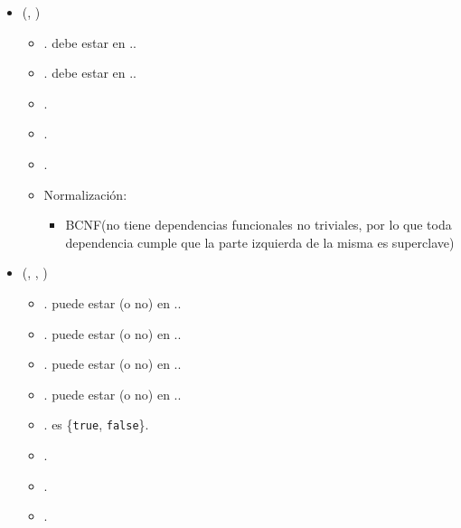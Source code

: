\begin{itemize}
        \item {}(, )
            \begin{itemize}
                \item {}. debe estar en 
                    ..
                \item {}. debe estar en 
                    ..
                \item {}.
                \item {}.
                \item {}.
                \item Normalización:
                    \begin{itemize}
                        \item BCNF(no tiene dependencias funcionales no 
                            triviales, por lo que toda dependencia cumple que la
                            parte izquierda de la misma es superclave)
                    \end{itemize}

            \end{itemize}

        \item {}(, , 
            )
            \begin{itemize}
                \item {}. puede estar (o no) en 
                    ..
                \item {}. puede estar (o no) en 
                    ..
                \item {}. puede estar (o no) en 
                    ..
                \item {}. puede estar (o no) en 
                    ..
                \item {}. es \{\texttt{true}, 
                        \texttt{false}\}.
                \item {}.
                \item {}.
                \item \FK{$\emptyset$}.
            \end{itemize}



\end{itemize}
